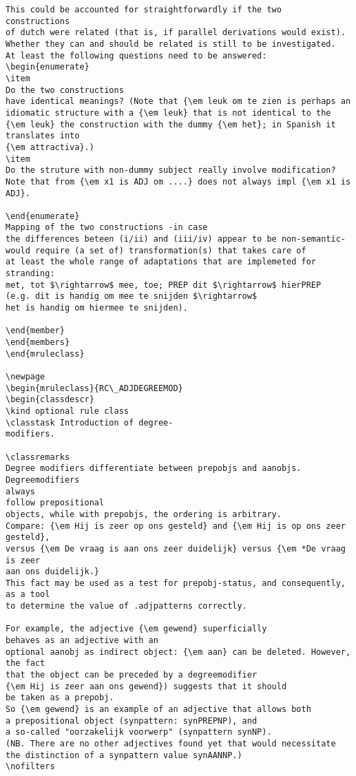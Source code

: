 \begin{verbatim}
This could be accounted for straightforwardly if the two  constructions
of dutch were related (that is, if parallel derivations would exist). 
Whether they can and should be related is still to be investigated. 
At least the following questions need to be answered: 
\begin{enumerate}
\item
Do the two constructions 
have identical meanings? (Note that {\em leuk om te zien is perhaps an 
idiomatic structure with a {\em leuk} that is not identical to the 
{\em leuk} the construction with the dummy {\em het}; in Spanish it 
translates into 
{\em attractiva}.) 
\item
Do the struture with non-dummy subject really involve modification?
Note that from {\em x1 is ADJ om ....} does not always impl {\em x1 is ADJ}.

\end{enumerate}
Mapping of the two constructions -in case 
the differences beteen (i/ii) and (iii/iv) appear to be non-semantic- 
would require (a set of) transformation(s) that takes care of 
at least the whole range of adaptations that are implemeted for stranding:
met, tot $\rightarrow$ mee, toe; PREP dit $\rightarrow$ hierPREP 
(e.g. dit is handig om mee te snijden $\rightarrow$ 
het is handig om hiermee te snijden).

\end{member}
\end{members}
\end{mruleclass}

\newpage
\begin{mruleclass}{RC\_ADJDEGREEMOD}
\begin{classdescr}
\kind optional rule class
\classtask Introduction of degree-
modifiers.

\classremarks
Degree modifiers differentiate between prepobjs and aanobjs. Degreemodifiers 
always 
follow prepositional 
objects, while with prepobjs, the ordering is arbitrary.
Compare: {\em Hij is zeer op ons gesteld} and {\em Hij is op ons zeer gesteld}, 
versus {\em De vraag is aan ons zeer duidelijk} versus {\em *De vraag is zeer 
aan ons duidelijk.}
This fact may be used as a test for prepobj-status, and consequently, as a tool
to determine the value of .adjpatterns correctly.

For example, the adjective {\em gewend} superficially  
behaves as an adjective with an 
optional aanobj as indirect object: {\em aan} can be deleted. However, the fact 
that the object can be preceded by a degreemodifier 
{\em Hij is zeer aan ons gewend}) suggests that it should 
be taken as a prepobj.  
So {\em gewend} is an example of an adjective that allows both
a prepositional object (synpattern: synPREPNP), and
a so-called "oorzakelijk voorwerp" (synpattern synNP).
(NB. There are no other adjectives found yet that would necessitate 
the distinction of a synpattern value synAANNP.)
\nofilters


\end{verbatim}
